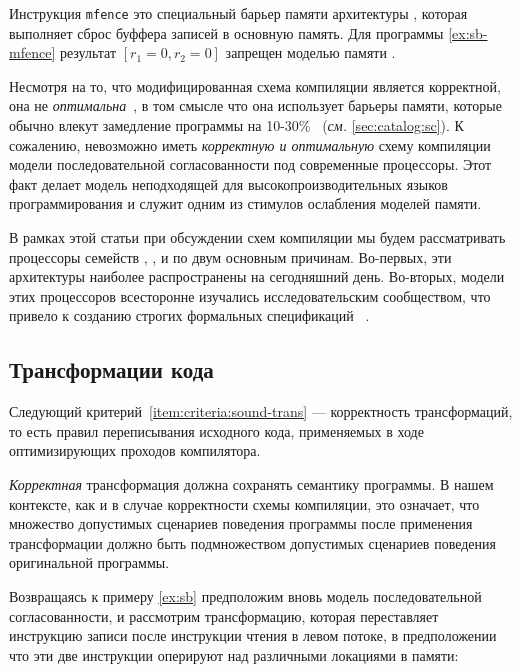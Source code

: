 Инструкция \texttt{mfence} это специальный барьер памяти 
архитектуры \Intel, которая выполняет сброс буффера записей в основную память. 
Для программы \ref{ex:sb-mfence} результат ${[r_1=0, r_2=0]}$
запрещен моделью памяти \Intel. 

Несмотря на то, что модифицированная схема компиляции является корректной, 
она не \emph{оптимальна}~\cite{OptimalCompilationCPP}, 
в том смысле что она использует барьеры памяти,
которые обычно влекут замедление программы 
на 10-30\%~\cite{Marino-al:PLDI11, Liu-al:OOPSLA17}
(\emph{см.} \cref{sec:catalog:sc}).
К сожалению, невозможно иметь \emph{корректную и оптимальную} 
схему компиляции модели последовательной согласованности 
под современные процессоры. 
Этот факт делает модель \SC неподходящей 
для высокопроизводительных языков программирования 
и служит одним из стимулов ослабления моделей памяти. 

В рамках этой статьи при обсуждении 
схем компиляции мы будем рассматривать процессоры семейств
\Intel, ,  и \POWER 
по двум основным причинам. 
Во-первых, эти архитектуры наиболее 
распространены на сегодняшний день. 
Во-вторых, модели этих процессоров 
всесторонне изучались исследовательским сообществом, 
что привело к созданию строгих 
формальных спецификаций~%
\cite{Sewell-al:CACM10, Sarkar-al:PLDI11, 
Flur-al:POPL16, Pulte-al:POPL18}. 

\subsection{Трансформации кода}
\label{sec:background:trans}

Следующий критерий~\ref{item:criteria:sound-trans} ---
корректность трансформаций, то есть правил переписывания 
исходного кода, применяемых в ходе оптимизирующих проходов компилятора. 

\emph{Корректная} трансформация должна сохранять семантику программы. 
В нашем контексте, как и в случае корректности схемы компиляции,
это означает, что множество допустимых сценариев поведения 
программы после применения трансформации должно 
быть подмножеством допустимых сценариев поведения оригинальной программы.

Возвращаясь к примеру \ref{ex:sb}
предположим вновь модель последовательной согласованности, 
и рассмотрим трансформацию, которая переставляет
инструкцию записи после инструкции чтения в левом потоке, 
в предположении что эти две инструкции 
оперируют над различными локациями в памяти:


